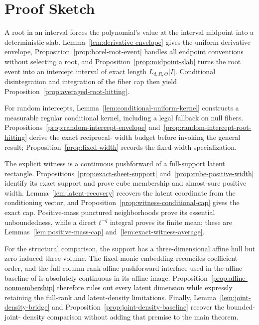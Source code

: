 \section{Proof Sketch}

A root in an interval forces the polynomial's value at the interval
midpoint into a deterministic slab.  Lemma~\ref{lem:derivative-envelope}
gives the uniform derivative envelope,
Proposition~\ref{prop:borel-root-event} handles all endpoint conventions
without selecting a root, and Proposition~\ref{prop:midpoint-slab} turns
the root event into an intercept interval of exact length
$L_{d,R,\Theta}|I|$.  Conditional disintegration and integration of the
fiber cap then yield Proposition~\ref{prop:averaged-root-hitting}.

For random intercepts, Lemma~\ref{lem:conditional-uniform-kernel}
constructs a measurable regular conditional kernel, including a legal
fallback on null fibers.  Propositions~\ref{prop:random-intercept-envelope}
and~\ref{prop:random-intercept-root-hitting} derive the exact reciprocal-
width budget before invoking the general result; Proposition~\ref{prop:fixed-width}
records the fixed-width specialization.

The explicit witness is a continuous pushforward of a full-support latent
rectangle.  Propositions~\ref{prop:exact-sheet-support}
and~\ref{prop:cube-positive-width} identify its exact support and prove
cube membership and almost-sure positive width.  Lemma~\ref{lem:latent-recovery}
recovers the latent coordinate from the conditioning vector, and
Proposition~\ref{prop:witness-conditional-cap} gives the exact cap.
Positive-mass punctured neighborhoods prove its essential unboundedness,
while a direct $t^{-q}$ integral proves its finite mean; these are
Lemmas~\ref{lem:positive-mass-cap} and~\ref{lem:exact-witness-average}.

For the structural comparison, the support has a three-dimensional affine
hull but zero induced three-volume.  The fixed-monic embedding reconciles
coefficient order, and the full-column-rank affine-pushforward interface
used in the affine baseline of \citet{balcan2020semibandit} is absolutely
continuous in its affine image.  Proposition~\ref{prop:affine-nonmembership}
therefore rules out every latent dimension while expressly retaining the
full-rank and latent-density limitations.  Finally,
Lemma~\ref{lem:joint-density-bridge} and
Proposition~\ref{prop:joint-density-baseline} recover the bounded-joint-
density comparison without adding that premise to the main theorem.
